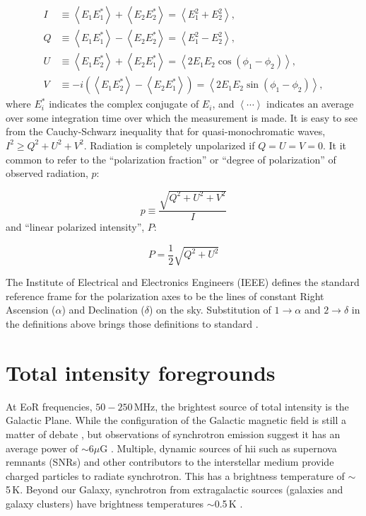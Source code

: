 \begin{align}
I &\equiv  \left\langle E_1E_1^* \right\rangle + \left\langle E_2E_2^* \right\rangle = \left\langle E_1^2 + E_2^2 \right\rangle, \\
Q &\equiv \left\langle E_1E_1^* \right\rangle - \left\langle E_2E_2^* \right\rangle = \left\langle E_1^2 - E_2^2 \right\rangle, \\
U &\equiv \left\langle E_1E_2^* \right\rangle + \left\langle E_2E_1^* \right\rangle = \left\langle 2 E_1 E_2 \cos(\phi_1 - \phi_2)\right\rangle, \\
V &\equiv -i (\left\langle E_1E_2^* \right\rangle - \left\langle E_2E_1^* \right\rangle) = \left\langle 2 E_1 E_2 \sin(\phi_1 - \phi_2)\right\rangle,
\end{align}
where $E_i^*$ indicates the complex conjugate of $E_i$, and $\left\langle \cdots \right\rangle$ indicates an average over some integration time over which the measurement is made. It is easy to see from the Cauchy-Schwarz inequality that for quasi-monochromatic waves, $I^2 \geq Q^2 + U^2 + V^2$. Radiation is completely unpolarized if $Q=U=V=0$. It it common to refer to the ``polarization fraction'' or ``degree of polarization'' of observed radiation, $p$:

\begin{equation}
p \equiv \frac{\sqrt{Q^2 + U^2 + V^2}}{I}
\end{equation}
and ``linear polarized intensity'', $P$:

\begin{equation}
P = \frac{1}{2}\sqrt{Q^2 + U^2}
\end{equation}

The Institute of Electrical and Electronics Engineers (IEEE) defines the standard reference frame for the polarization axes to be the lines of constant Right Ascension ($\alpha$) and Declination ($\delta$) on the sky. Substitution of $1\rightarrow\alpha$ and $2\rightarrow\delta$ in the definitions above brings those definitions to standard \citep{Cohen.58, Ludwig.73, vanStraten.10}.

\section{Total intensity foregrounds}

At EoR frequencies, $50 - 250$\,MHz, the brightest source of total intensity is the Galactic Plane. While the configuration of the Galactic magnetic field is still a matter of debate \citep[e.g.][]{Haverkorn.15}, but observations of synchrotron emission suggest it has an average power of $\sim6\mu$G \citep[e.g.][]{Beck.03}. Multiple, dynamic sources of {\sc hii} such as supernova remnants (SNRs) and other contributors to the interstellar medium provide charged particles to radiate synchrotron. This has a brightness temperature of $\sim$5\,K. Beyond our Galaxy, synchrotron from extragalactic sources (galaxies and galaxy clusters) have brightness temperatures $\sim$0.5\,K \citep[e.g.][]{Jelic.10}. 

